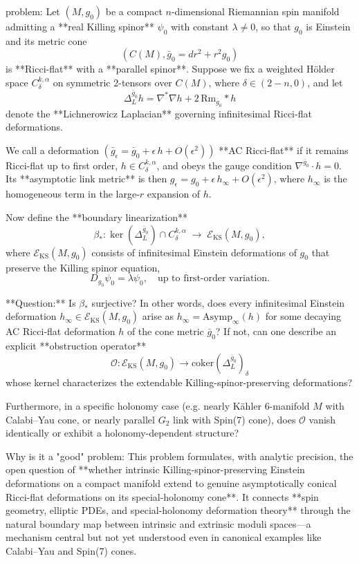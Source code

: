 problem:  
Let \((M,g_0)\) be a compact \(n\)-dimensional Riemannian spin manifold admitting a **real Killing spinor** \(\psi_0\) with constant \(\lambda \neq 0\), so that \(g_0\) is Einstein and its metric cone  
\[
(C(M), \bar g_0 = dr^2 + r^2 g_0)
\]
is **Ricci-flat** with a **parallel spinor**.  Suppose we fix a weighted Hölder space \(C^{k,\alpha}_\delta\) on symmetric 2-tensors over \(C(M)\), where \(\delta \in (2-n,0)\), and let 
\[
\Delta_L^{\bar g_0} h = \nabla^*\nabla h + 2\,\mathrm{Rm}_{\bar g_0}*h
\]
denote the **Lichnerowicz Laplacian** governing infinitesimal Ricci-flat deformations.

We call a deformation \((\bar g_\epsilon = \bar g_0 + \epsilon\, h + O(\epsilon^2))\) **AC Ricci-flat** if it remains Ricci-flat up to first order, \(h \in C^{k,\alpha}_\delta\), and obeys the gauge condition \(\nabla^{\bar g_0}\!\!\cdot h = 0\).  Its **asymptotic link metric** is then \(g_\epsilon = g_0 + \epsilon\, h_\infty + O(\epsilon^2)\), where \(h_\infty\) is the homogeneous term in the large-\(r\) expansion of \(h\).

Now define the **boundary linearization**  
\[
\beta_* : \ker(\Delta_L^{\bar g_0}) \cap C^{k,\alpha}_\delta \;\longrightarrow\; \mathcal{E}_{\mathrm{KS}}(M,g_0),
\]
where \(\mathcal{E}_{\mathrm{KS}}(M,g_0)\) consists of infinitesimal Einstein deformations of \(g_0\) that preserve the Killing spinor equation,
\[
D_{g_0}\psi_0 = \lambda \psi_0, \quad \text{up to first-order variation.}
\]

**Question:**  
Is \(\beta_*\) surjective?  In other words, does every infinitesimal Einstein deformation \(h_\infty \in \mathcal{E}_{\mathrm{KS}}(M,g_0)\) arise as \(h_\infty = \mathrm{Asymp}_\infty(h)\) for some decaying AC Ricci-flat deformation \(h\) of the cone metric \(\bar g_0\)?  
If not, can one describe an explicit **obstruction operator**
\[
\mathcal{O}: \mathcal{E}_{\mathrm{KS}}(M,g_0)\longrightarrow \mathrm{coker}(\Delta_L^{\bar g_0})_\delta
\]
whose kernel characterizes the extendable Killing-spinor-preserving deformations?  

Furthermore, in a specific holonomy case (e.g. nearly Kähler 6-manifold \(M\) with Calabi–Yau cone, or nearly parallel \(G_2\) link with Spin(7) cone), does \(\mathcal{O}\) vanish identically or exhibit a holonomy-dependent structure?

Why is it a "good" problem:  
This problem formulates, with analytic precision, the open question of **whether intrinsic Killing-spinor-preserving Einstein deformations on a compact manifold extend to genuine asymptotically conical Ricci-flat deformations on its special-holonomy cone**. It connects **spin geometry, elliptic PDEs, and special-holonomy deformation theory** through the natural boundary map between intrinsic and extrinsic moduli spaces—a mechanism central but not yet understood even in canonical examples like Calabi–Yau and Spin(7) cones.  

